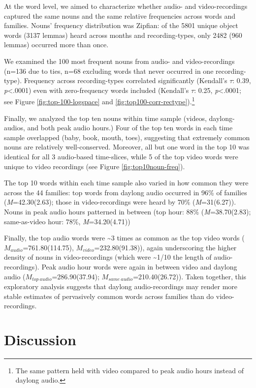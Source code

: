 \documentclass[man]{apa6}
\theoremstyle{definition}
\theoremstyle{definition}
\theoremstyle{definition}
\theoremstyle{remark}
\begin{document}
At the word level, we aimed to characterize whether audio- and
video-recordings captured the same nouns and the same relative
frequencies across words and families. Nouns' frequency distribution was
Zipfian: of the 5801 unique object words (3137 lemmas) heard across
months and recording-types, only 2482 (960 lemmas) occurred more than
once.

We examined the 100 most frequent nouns from audio- and video-recordings
(n=136 due to ties, n=68 excluding words that never occurred in one
recording-type). Frequency across recording-types correlated
significantly (Kendall's \(\tau\): 0.39, \emph{p}\textless{}.0001) even
with zero-frequency words included (Kendall's \(\tau\): 0.25,
\emph{p}\textless{}.0001; see Figure \ref{fig:top-100-logspace} and
\ref{fig:top100-corr-rectype}).\footnote{The same pattern held with video compared to peak audio hours instead of daylong audio.}

Finally, we analyzed the top ten nouns within time sample (videos,
daylong-audios, and both peak audio hours.) Four of the top ten words in
each time sample overlapped (baby, book, mouth, toes), suggesting that
extremely common nouns are relatively well-conserved. Moreover, all but
one word in the top 10 was identical for all 3 audio-based time-slices,
while 5 of the top video words were unique to video recordings (see
Figure \ref{fig:top10noun-freq}).

The top 10 words within each time sample also varied in how common they
were across the 44 families: top words from daylong audio occurred in
96\% of families (\emph{M}=42.30(2.63); those in video-recordings were
heard by 70\% (\emph{M}=31(6.27)). Nouns in peak audio hours patterned
in between (top hour: 88\% (\emph{M}=38.70(2.83); same-as-video hour:
78\%, \emph{M}=34.20(4.71))

Finally, the top audio words were \textasciitilde{}3 times as common as
the top video words (\(M_{audio}\)=761.80(114.75),
\(M_{video}\)=232.80(91.38)), again underscoring the higher density of
nouns in video-recordings (which were \textasciitilde{}1/10 the length
of audio-recordings). Peak audio hour words were again in between video
and daylong audio (\(M_{top\ audio}\)=286.90(37.94);
\(M_{same\ audio}\)=210.40(26.72)). Taken together, this exploratory
analysis suggests that daylong audio-recordings may render more stable
estimates of pervasively common words across families than do
video-recordings.

\section{Discussion}\label{discussion}
\end{document}
